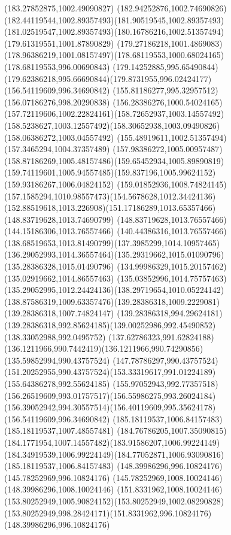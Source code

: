 {{  \lineto(183.27852875,1002.49090827)
  \curveto(182.94252876,1002.74690826)(182.44119544,1002.89357493)(181.90519545,1002.89357493)
  \curveto(181.02519547,1002.89357493)(180.16786216,1002.51357494)(179.61319551,1001.87890829)
  \curveto(179.27186218,1001.4869083)(178.96386219,1001.08157497)(178.68119553,1000.68024165)
  \lineto(178.68119553,996.00690843)
  \curveto(179.14252885,995.65490844)(179.62386218,995.66690844)(179.8731955,996.02424177)
  \moveto(156.54119609,996.34690842)
  \lineto(155.81186277,995.32957512)
  \lineto(156.07186276,998.20290838)
  \curveto(156.28386276,1000.54024165)(157.72119606,1002.22824161)(158.72652937,1003.14557492)
  \curveto(158.5238627,1003.12557492)(158.30652938,1003.09490826)(158.06386272,1003.04557492)
  \lineto(155.48919611,1002.51357494)
  \lineto(157.3465294,1004.37357489)
  \curveto(157.98386272,1005.00957487)(158.87186269,1005.48157486)(159.65452934,1005.89890819)
  \curveto(159.74119601,1005.94557485)(159.837196,1005.99624152)(159.93186267,1006.04824152)
  \curveto(159.01852936,1008.74824145)(157.1585294,1010.98557473)(154.5678628,1012.34424136)
  \curveto(152.88519618,1013.226908)(151.17186289,1013.65357466)(148.83719628,1013.74690799)
  \lineto(148.83719628,1013.76557466)
  \lineto(144.15186306,1013.76557466)
  \curveto(140.44386316,1013.76557466)(138.68519653,1013.81490799)(137.3985299,1014.10957465)
  \curveto(136.29052993,1014.36557464)(135.29319662,1015.01090796)(135.28386328,1015.01490796)
  \lineto(134.99986329,1015.20157462)
  \lineto(135.02919662,1014.86557463)
  \curveto(135.03852996,1014.75757463)(135.29052995,1012.24424136)(138.29719654,1010.05224142)
  \curveto(138.87586319,1009.63357476)(139.28386318,1009.2229081)(139.28386318,1007.74824147)
  \lineto(139.28386318,994.29624181)
  \curveto(139.28386318,992.85624185)(139.00252986,992.45490852)(138.33052988,992.0495752)
  \curveto(137.62786323,991.62824188)(136.1211966,990.7442419)(136.1211966,990.74290856)
  \lineto(135.59852994,990.43757524)
  \lineto(147.78786297,990.43757524)
  \curveto(151.20252955,990.43757524)(153.33319617,991.01224189)(155.64386278,992.55624185)
  \curveto(155.97052943,992.77357518)(156.26519609,993.01757517)(156.55986275,993.26024184)
  \curveto(156.39052942,994.30557514)(156.40119609,995.35624178)(156.54119609,996.34690842)
  \moveto(185.18119537,1006.84157483)
  \lineto(185.18119537,1007.48557481)
  \curveto(184.76786205,1007.35090815)(184.1771954,1007.14557482)(183.91586207,1006.99224149)
  \curveto(184.34919539,1006.99224149)(184.77052871,1006.93090816)(185.18119537,1006.84157483)
  \moveto(148.39986296,996.10824176)
  \lineto(145.78252969,996.10824176)
  \lineto(145.78252969,1008.10024146)
  \lineto(148.39986296,1008.10024146)
  \curveto(151.8331962,1008.10024146)(153.80252949,1005.90824152)(153.80252949,1002.08290828)
  \curveto(153.80252949,998.28424171)(151.8331962,996.10824176)(148.39986296,996.10824176)
}
}
